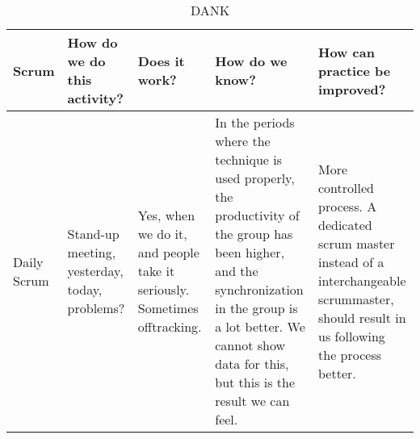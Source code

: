 \begin{sidewaystable}[]
\centering
\caption{DANK}
\label{my-label}
\begin{tabularx}{\textwidth}{|l|X|X|X|X|}
\hline
Scrum
& How do we do this activity?                                                                                                                                                                             & Does it work?                                                                                                                                                                                                                                                                              & How do we know?                                                                                                                                                                                                                                                                                                                                                                                                                                         & How can practice be improved?                                                                                                                                                                                                                                                                \\ \hline
Daily Scrum                 
& Stand-up meeting, yesterday, today, problems?                                                                                                                                                           
& Yes, when we do it, and people take it seriously. Sometimes offtracking.                                                                                                                                                                                                                   
& In the periods where the technique is used properly, the productivity of the group has been higher, and the synchronization in the group is a lot better. We cannot show data for this, but this is the result we can feel.                                                                                                                                                                                                                             & More controlled process. A dedicated scrum master instead of a interchangeable scrummaster, should result in us following the process better.                                                                                                                                                \\ \hline

\end{tabularx}
\end{sidewaystable}
